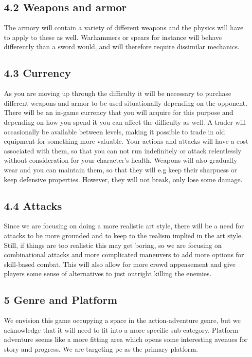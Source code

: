 \documentclass{article}
\begin{document}
\begin{titlepage}
\subsection{ 4.2 Weapons and armor }
The armory will contain a variety of different weapons and the physics will have to apply to these as well. Warhammers or spears for instance will behave differently than a sword would, and will therefore require dissimilar mechanics. 

\subsection{ 4.3 Currency }
As you are moving up through the difficulty it will be necessary to purchase different weapons and armor to be used situationally depending on the opponent. There will be an in-game currency that you will acquire for this purpose and depending on how you spend it you can affect the difficulty as well. A trader will occasionally be available between levels, making it possible to trade in old equipment for something more valuable.
Your actions and attacks will have a cost associated with them, so that you can not run indefinitely or attack relentlessly without consideration for your character's health. 
Weapons will also gradually wear and you can maintain them, so that they will e.g keep their sharpness or keep defensive properties. However, they will not break, only lose some damage.

\subsection{ 4.4 Attacks }
Since we are focusing on doing a more realistic art style, there will be a need for attacks to be more grounded and to keep to the realism implied in the art style. Still, if things are too realistic this may get boring, so we are focusing on combinational attacks and more complicated maneuvers to add more options for skill-based combat. This will also allow for more crowd appeasement and give players some sense of alternatives to just outright killing the enemies.

\subsection{ 5 Genre and Platform }
We envision this game occupying a space in the action-adventure genre, but we acknowledge that it will need to fit into a more specific sub-category. Platform-adventure seems like a more fitting area which opens some interesting avenues for story and progress.
We are targeting pc as the primary platform.



\end{titlepage}
\end{document}
